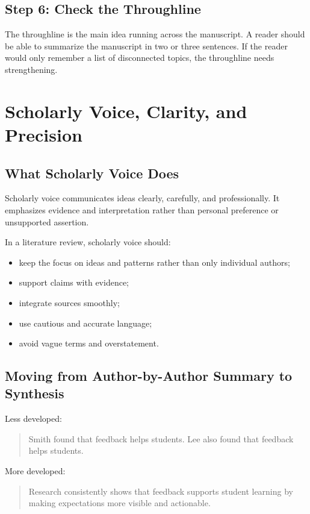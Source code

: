 \documentclass[11pt]{article}
\begin{document}
\subsection{Step 6: Check the Throughline}

The throughline is the main idea running across the manuscript. A reader should be able to summarize the manuscript in two or three sentences. If the reader would only remember a list of disconnected topics, the throughline needs strengthening.

\section{Scholarly Voice, Clarity, and Precision}

\subsection{What Scholarly Voice Does}

Scholarly voice communicates ideas clearly, carefully, and professionally. It emphasizes evidence and interpretation rather than personal preference or unsupported assertion.

In a literature review, scholarly voice should:

\begin{itemize}
  \item keep the focus on ideas and patterns rather than only individual authors;
  \item support claims with evidence;
  \item integrate sources smoothly;
  \item use cautious and accurate language;
  \item avoid vague terms and overstatement.
\end{itemize}

\subsection{Moving from Author-by-Author Summary to Synthesis}

Less developed:

\begin{quote}
Smith found that feedback helps students. Lee also found that feedback helps students.
\end{quote}

More developed:

\begin{quote}
Research consistently shows that feedback supports student learning by making expectations more visible and actionable.
\end{quote}
\end{document}
